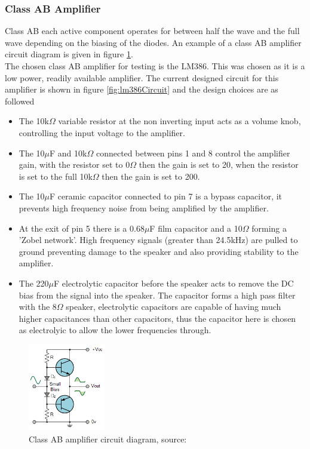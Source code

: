\documentclass[12pt, a4paper]{article}
\begin{document}
\subsubsection{Class AB Amplifier}
Class AB each active component operates for between half the wave and the full wave depending on the biasing of the diodes. An example of a class AB amplifier circuit diagram is given in figure \ref{fig:classABAmplifier}.\\

The chosen class AB amplifier for testing is the LM386. This was chosen as it is a low power, readily available amplifier. The current designed circuit for this amplifier is shown in figure \ref{fig:lm386Circuit} and the design choices are as followed\\
\begin{itemize}
	\item The 10k$\Omega$ variable resistor at the non inverting input acts as a volume knob, controlling the input voltage to the amplifier.
	\item The 10$\mu$F and 10k$\Omega$ connected between pins 1 and 8 control the amplifier gain, with the resistor set to 0$\Omega$ then the gain is set to 20, when the resistor is set to the full 10k$\Omega$ then the gain is set to 200.
	\item The 10$\mu$F ceramic capacitor connected to pin 7 is a bypass capacitor, it prevents high frequency noise from being amplified by the amplifier. 
	\item At the exit of pin 5 there is a 0.68$\mu$F film capacitor and a 10$\Omega$ forming a 'Zobel network'. High frequency signals (greater than 24.5kHz) are pulled to ground preventing damage to the speaker and also providing stability to the amplifier.
	\item The 220$\mu$F electrolytic capacitor before the speaker acts to remove the DC bias from the signal into the speaker. The capacitor forms a high pass filter with the 8$\Omega$ speaker, electrolytic capacitors are capable of having much higher capacitances than other capacitors, thus the capacitor here is chosen as electrolyic to allow the lower frequencies through. 
\end{itemize}

\begin{figure}[!htb]
	\hfill\includegraphics[width=0.3\textwidth]{./Figures/class_AB_amplifier}\hspace*{\fill}
	\caption{Class AB amplifier circuit diagram, source: \cite{amplifiers}}
	\label{fig:classABAmplifier}
\end{figure}
 
\end{document}
